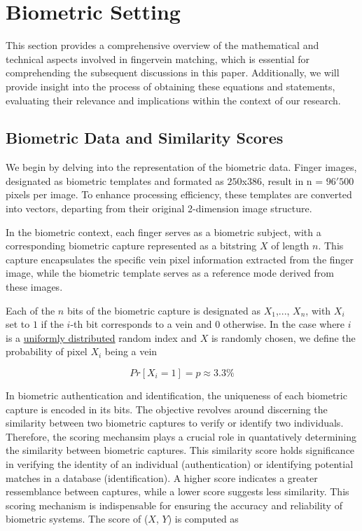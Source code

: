 
\section{Biometric Setting}
This section provides a comprehensive overview of the mathematical and technical aspects involved in fingervein matching, which is essential for comprehending the subsequent discussions in this paper. Additionally, we will provide insight into the process of obtaining these equations and statements, evaluating their relevance and implications within the context of our research. 

\subsection{Biometric Data and Similarity Scores}
We begin by delving into the representation of the biometric data. Finger images, designated as biometric templates and formated as \(250\)x\(386\), result in n = \(96'500\) pixels per image. To enhance processing efficiency, these templates are converted into vectors, departing from their original 2-dimension image structure. 

In the biometric context, each finger serves as a biometric subject, with a corresponding biometric capture represented as a bitstring \(X\) of length \(n\). This capture encapsulates the specific vein pixel information extracted from the finger image, while the biometric template serves as a reference mode derived from these images. 

Each of the \(n\) bits of the biometric capture is designated as \(X_1\),..., \(X_n\), with \(X_i\) set to \(1\) if the \(i\)-th bit corresponds to a vein and \(0\) otherwise. In the case where \(i\) is a \hyperref[def:Uniform Distribution]{uniformly distributed} random index and \(X\) is randomly chosen, we define the probability of pixel \(X_i\) being a vein 

\begin{equation} \label{eq:proba}
    Pr[X_i = 1] = p \approx 3.3 \% 
\end{equation}

In biometric authentication and identification, the uniqueness of each biometric capture is encoded in its bits. The objective revolves around discerning the similarity between two biometric captures to verify or identify two individuals. Therefore, the scoring mechansim plays a crucial role in quantatively determining the similarity between biometric captures. This similarity score holds significance in verifying the identity of an individual (authentication) or identifying potential matches in a database (identification). A higher score indicates a greater ressemblance between captures, while a lower score suggests less similarity. This scoring mechanism is indispensable for ensuring the accuracy and reliability of biometric systems. The score of (\(X\), \(Y\)) is computed as

